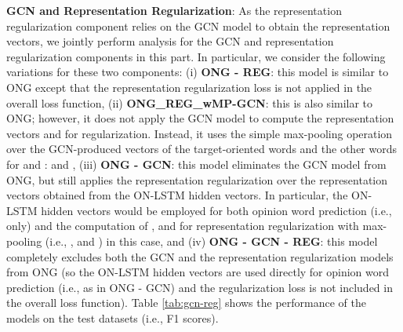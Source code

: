 \documentclass[11pt,a4paper]{article}
\begin{document}
{\bf GCN and Representation Regularization}: As the representation regularization component relies on the GCN model to obtain the representation vectors, we jointly perform analysis for the GCN and representation regularization components in this part. In particular, we consider the following variations for these two components: (i) {\bf ONG - REG}: this model is similar to ONG except that the representation regularization loss  is not applied in the overall loss function, (ii) {\bf ONG\_REG\_wMP-GCN}: this is also similar to ONG; however, it does not apply the GCN model to compute the representation vectors  and  for regularization. Instead, it uses the simple max-pooling operation over the GCN-produced vectors  of the target-oriented words  and the other words  for  and :  and , (iii) {\bf ONG - GCN}: this model eliminates the GCN model from ONG, but still applies the representation regularization over the representation vectors obtained from the ON-LSTM hidden vectors. In particular, the ON-LSTM hidden vectors  would be employed for both opinion word prediction (i.e.,  only) and the computation of ,  and  for representation regularization with max-pooling (i.e., ,  and ) in this case, and (iv) {\bf ONG - GCN - REG}: this model completely excludes both the GCN and the representation regularization models from ONG (so the ON-LSTM hidden vectors  are used directly for opinion word prediction (i.e.,  as in ONG - GCN) and the regularization loss  is not included in the overall loss function). Table \ref{tab:gcn-reg} shows the performance of the models on the test datasets (i.e., F1 scores).
\begin{table}[ht]
\centering
    \caption{Performance of the variations of the GCN and representation regularization components.}
    \label{tab:gcn-reg}
\end{table}
\end{document}
